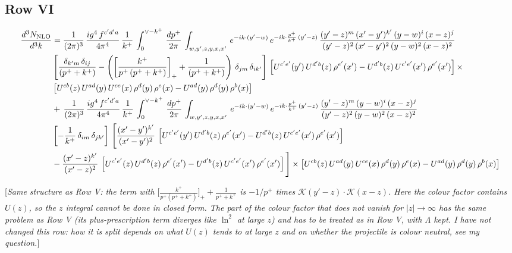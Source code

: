 \documentclass[9pt]{article}
\numberwithin{equation}{section}
\newcommand{\rnote}[1]{{\color{teal}[\textit{#1}]}}
\begin{document}
\subsection{Row VI}
\begin{align}
    \frac{d^{3}N_{\rm NLO}}{d^{3}k} & =  \frac{1}{(2\pi)^{3}}\, \frac{ig^{4}\,f^{c'd'a}}{4\pi^{4}}\, \frac{1}{k^{+}}\,\int_{0}^{\vee-k^{+}}\, \frac{dp^{+}}{2\pi}\, \int_{w,y',z,y,x,x'}\, e^{-ik\cdot (y'-w)}\, e^{-ik\cdot \frac{p^{+}}{k^{+}}\,(y'-z)}\,\frac{(y'-z)^{m}\,(x'-y')^{k'}\,(y-w)^{i}\,(x-z)^{j}}{(y'-z)^{2}\,(x'-y')^{2}\,(y-w)^{2}\,(x-z)^{2}}\notag \\ & \left[\frac{\delta_{k'm}\,\delta_{ij}}{(p^{+}+k^{+})}-\left(\left[\frac{k^{+}}{p^{+}\,(p^{+}+k^{+})}\right]_{+}+\frac{1}{(p^{+}+k^{+})}\right)\,\delta_{jm}\,\delta_{ik'}\right]\, \left[U^{c'e'}(y')\,U^{d'b}(z)\,\rho^{e'}(x')-U^{d'b}(z)\,U^{c'e'}(x')\,\rho^{e'}(x')\right]\times\notag \\ &  \left[U^{cb}(z)\,U^{ad}(y)\,U^{ce}(x)\,\rho^{d}(y)\,\rho^{e}(x)-U^{ad}(y)\,\rho^{d}(y)\,\rho^{b}(x)\right] \notag \\ &  +\,\frac{1}{(2\pi)^{3}}\, \frac{ig^{4}\,f^{c'd'a}}{4\pi^{4}}\, \frac{1}{k^{+}}\,\int_{0}^{\vee-k^{+}}\, \frac{dp^{+}}{2\pi}\, \int_{w,y',z,y,x,x'}\, e^{-ik\cdot (y'-w)}\, e^{-ik\cdot \frac{p^{+}}{k^{+}}\,(y'-z)}\,\frac{(y'-z)^{m}\,(y-w)^{i}\,(x-z)^{j}}{(y'-z)^{2}\,(y-w)^{2}\,(x-z)^{2}}\notag \\ &  \left[-\frac{1}{k^{+}}\, \delta_{im}\, \delta_{jk'}\right]\, \Bigg[\frac{(x'-y')^{k'}}{(x'-y')^{2}}\,\left[U^{c'e'}(y')\,U^{d'b}(z)\,\rho^{e'}(x')-U^{d'b}(z)\,U^{c'e'}(x')\,\rho^{e'}(x')\right]\notag \\ & -\frac{(x'-z)^{k'}}{(x'-z)^{2}}\,\left[U^{c'e'}(z)\,U^{d'b}(z)\,\rho^{e'}(x')-U^{d'b}(z)\,U^{c'e'}(x')\,\rho^{e'}(x')\right]\Bigg]\times    \left[U^{cb}(z)\,U^{ad}(y)\,U^{ce}(x)\,\rho^{d}(y)\,\rho^{e}(x)-U^{ad}(y)\,\rho^{d}(y)\,\rho^{b}(x)\right]
\end{align}

\rnote{Same structure as Row V: the term with $\big[\frac{k^{+}}{p^{+}(p^{+}+k^{+})}\big]_{+}+\frac{1}{p^{+}+k^{+}}$ is $-1/p^{+}$ times $\mathcal{K}(y'-z)\cdot\mathcal{K}(x-z)$. Here the colour factor contains $U(z)$, so the $z$ integral cannot be done in closed form. The part of the colour factor that does not vanish for $|z|\to\infty$ has the same problem as Row V (its plus-prescription term diverges like $\ln^{2}$ at large $z$) and has to be treated as in Row V, with $\Lambda$ kept. I have not changed this row: how it is split depends on what $U(z)$ tends to at large $z$ and on whether the projectile is colour neutral, see my question.}
\end{document}
